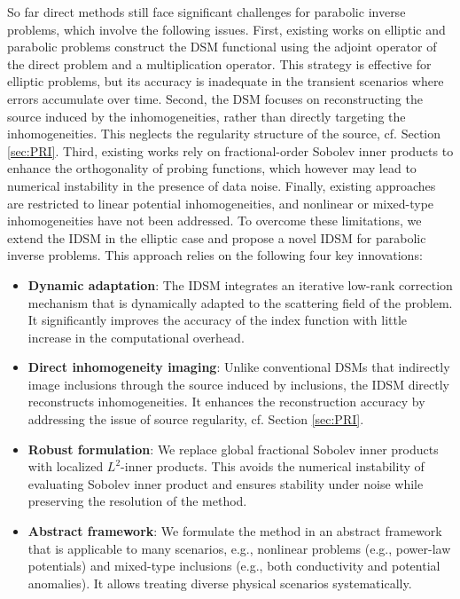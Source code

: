 \documentclass[onefignum,onetabnum]{siamart190516}
\numberwithin{equation}{section}
\begin{document}
So far direct methods still face significant challenges for parabolic inverse problems, which involve the following issues.
First, existing works on elliptic and parabolic problems \cite{Zou2014,Zou2015,Zou2021,ChowItoZou:2018sisc} construct the DSM functional using the adjoint operator of the direct problem and a multiplication operator.
This strategy is effective for elliptic problems, but its accuracy is inadequate in the transient scenarios where errors accumulate over time.
Second, the DSM focuses on reconstructing the source induced by the inhomogeneities, rather than directly targeting the inhomogeneities.
This neglects the regularity structure of the source, cf. Section \ref{sec:PRI}.
Third, existing works rely on fractional-order Sobolev inner products to enhance the orthogonality of probing functions, which however may lead to numerical instability in the presence of data noise.
Finally, existing approaches are restricted to linear potential inhomogeneities, and
nonlinear or mixed-type inhomogeneities have not been addressed.
To overcome these limitations, we extend the IDSM \cite{Ito2025Iterative} in the elliptic case and propose a novel IDSM for parabolic inverse problems. This approach relies on the following four key innovations:
\begin{itemize}
\item \textbf{Dynamic adaptation}:
The IDSM integrates an iterative low-rank correction mechanism that is dynamically adapted to the scattering field of the problem.
It significantly improves the accuracy of the index function with little increase in the computational overhead.

\item \textbf{Direct inhomogeneity imaging}:
Unlike conventional DSMs that indirectly image inclusions through the source induced by inclusions, the IDSM directly reconstructs inhomogeneities.
It enhances the reconstruction accuracy by addressing the issue of source regularity, cf. Section \ref{sec:PRI}.

\item \textbf{Robust formulation}:
We replace global fractional Sobolev inner products with localized $L^{2}$-inner products.
This avoids the numerical instability of evaluating Sobolev inner product and ensures stability under noise while preserving the resolution of the method.

\item \textbf{Abstract framework}:
We formulate the method in an abstract framework that is applicable to many scenarios, e.g., nonlinear problems (e.g., power-law potentials) and mixed-type inclusions (e.g., both conductivity and potential anomalies).
It allows treating diverse physical scenarios systematically.
\end{itemize}
\end{document}
